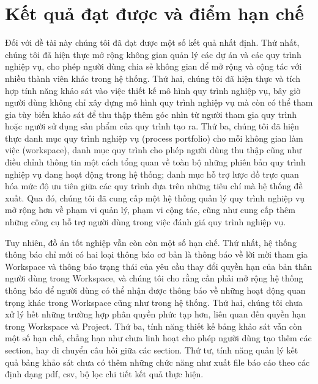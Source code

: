 \section{Kết quả đạt được và điểm hạn chế}
Đối với đề tài này chúng tôi đã đạt được một số kết quả nhất định. Thứ nhất, chúng tôi đã hiện thực mở rộng không gian quản lý các dự án và các quy trình nghiệp vụ, cho phép người dùng chia sẻ không gian để mở rộng và cộng tác với nhiều thành viên khác trong hệ thống. Thứ hai, chúng tôi đã hiện thực và tích hợp tính năng khảo sát vào việc thiết kế mô hình quy trình nghiệp vụ, bây giờ người dùng không chỉ xây dựng mô hình quy trình nghiệp vụ mà còn có thể tham gia tùy biến khảo sát để thu thập thêm góc nhìn từ người tham gia quy trình hoặc người sử dụng sản phẩm của quy trình tạo ra. Thứ ba, chúng tôi đã hiện thực danh mục quy trình nghiệp vụ (process portfolio) cho mỗi không gian làm việc (workspace), danh mục quy trình cho phép người dùng thu thập cũng như điều chỉnh thông tin một cách tổng quan về toàn bộ những phiên bản quy trình nghiệp vụ đang hoạt động trong hệ thống; danh mục hỗ trợ lược đồ trực quan hóa mức độ ưu tiên giữa các quy trình dựa trên những tiêu chí mà hệ thống đề xuất. Qua đó, chúng tôi đã cung cấp một hệ thống quản lý quy trình nghiệp vụ mở rộng hơn về phạm vi quản lý, phạm vi cộng tác, cũng như cung cấp thêm những công cụ hỗ trợ người dùng trong việc đánh giá quy trình nghiệp vụ.
\par
Tuy nhiên, đồ án tốt nghiệp vẫn còn còn một số hạn chế. Thứ nhất, hệ thống thông báo chỉ mới có hai loại thông báo cơ bản 
là thông báo về lời mời tham gia Workspace và thông báo trạng thái của yêu cầu thay đổi quyền hạn của bản thân người dùng 
trong Workspace, và chúng tôi cho rằng cần phải mở rộng hệ thống thông báo để người dùng có thể nhận được thông báo về những 
hoạt động quan trọng khác trong Workspace cũng như trong hệ thống. Thứ hai, chúng tôi chưa xử lý hết những trường hợp 
phân quyền phức tạp hơn, liên quan đến quyền hạn trong Workspace và Project. Thứ ba, tính năng thiết kế bảng khảo sát 
vẫn còn một số hạn chế, chẳng hạn như chưa linh hoạt cho phép người dùng tạo thêm các section, hay di chuyển câu hỏi 
giữa các section. Thứ tư, tính năng quản lý kết quả bảng khảo sát chưa có thêm những chức năng như xuất file báo cáo 
theo các định dạng pdf, csv, bộ lọc chi tiết kết quả thực hiện.

